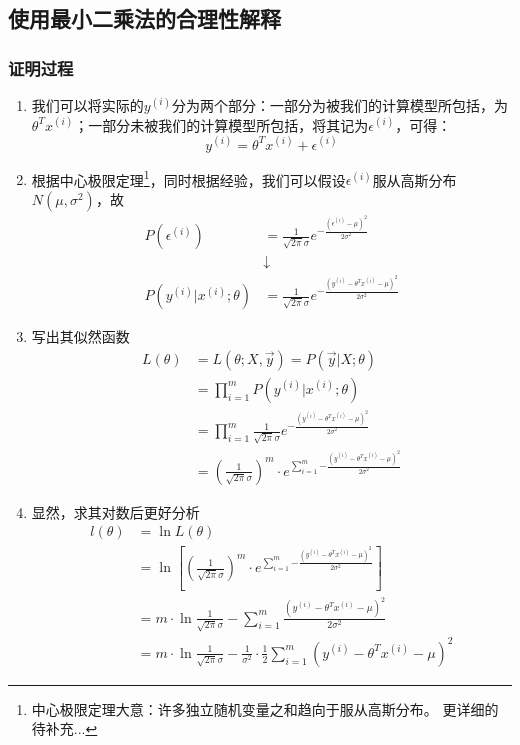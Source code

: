 \subsection{使用最小二乘法的合理性解释}
\subsubsection{证明过程}
\begin{enumerate}
	\item 我们可以将实际的$y^{(i)}$分为两个部分：一部分为被我们的计算模型所包括，为$\theta^Tx^{(i)}$；一部分未被我们的计算模型所包括，将其记为$\epsilon^{(i)}$，可得：
	\begin{equation}
		y^{(i)} = \theta^Tx^{(i)} + \epsilon^{(i)}
	\end{equation}

	\item 根据中心极限定理\footnote{中心极限定理大意：许多独立随机变量之和趋向于服从高斯分布。 更详细的待补充...}，同时根据经验，我们可以假设$\epsilon^{(i)}$服从高斯分布$N(\mu, \sigma^2)$，故
	\begin{align}
		P(\epsilon^{(i)}) &= \frac{1}{\sqrt{2\pi}\sigma}e^{-\frac{\left(\epsilon^{(i)}-\mu\right)^2}{2\sigma^2}}  \\
		&\downarrow \\
		P(y^{(i)}|x^{(i)};\theta) &= \frac{1}{\sqrt{2\pi}\sigma}e^{-\frac{\left(y^{(i)}-\theta^Tx^{(i)}-\mu\right)^2}{2\sigma^2}}
	\end{align}

	\item 写出其似然函数
	\begin{align}
		L(\theta) &= L(\theta; X, \vec{y}) = P(\vec{y}|X; \theta) \\
		&= \prod_{i=1}^{m}P(y^{(i)}|x^{(i)}; \theta) \\
		&= \prod_{i=1}^{m}\frac{1}{\sqrt{2\pi}\sigma}e^{-\frac{\left(y^{(i)}-\theta^Tx^{(i)}-\mu\right)^2}{2\sigma^2}} \\
		&= \left(\frac{1}{\sqrt{2\pi}\sigma}\right)^m\cdot e^{\sum_{i=1}^{m}{-\frac{\left(y^{(i)}-\theta^Tx^{(i)}-\mu\right)^2}{2\sigma^2}}}
	\end{align}

	\item 显然，求其对数后更好分析
	\begin{align}
		l(\theta) &= \ln{L(\theta)} \\
		&= \ln\left[\left(\frac{1}{\sqrt{2\pi}\sigma}\right)^m\cdot e^{\sum_{i=1}^{m}{-\frac{\left(y^{(i)}-\theta^Tx^{(i)}-\mu\right)^2}{2\sigma^2}}}\right] \\
		&= m\cdot\ln\frac{1}{\sqrt{2\pi}\sigma} - \sum_{i=1}^{m}\frac{\left(y^{(i)}-\theta^Tx^{(i)}-\mu\right)^2}{2\sigma^2} \\
		&= m\cdot\ln\frac{1}{\sqrt{2\pi}\sigma} - \frac{1}{{\sigma^2}}\cdot \frac{1}{2} \sum_{i=1}^{m}\left(y^{(i)}-\theta^Tx^{(i)}-\mu\right)^2
	\end{align}


\end{enumerate}
